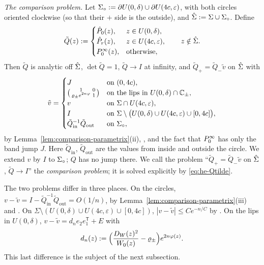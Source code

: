 \emph{The comparison problem.} Let $\Sigma_{\circ}:=\partial U(0,\delta)\cup\partial U(4c,\varepsilon)$, with both circles
oriented clockwise (so that their $+$ side is the outside), and $\hat\Sigma:=\Sigma\cup\Sigma_{\circ}$. Define
\begin{equation}\label{eq:he-Qtilde}
  \tilde Q(z):=\begin{cases}\hat P_0(z),& z\in U(0,\delta),\\ \hat P_r(z),& z\in U(4c,\varepsilon),\\
  P^\infty_0(z),& \text{otherwise},\end{cases}\qquad z\notin\hat\Sigma .
\end{equation}
Then $\tilde Q$ is analytic off $\hat\Sigma$, $\det\tilde Q=1$, $\tilde Q\to I$ at infinity, and
$\tilde Q_+=\tilde Q_-\tilde v$ on $\hat\Sigma$ with
\begin{equation}\label{eq:he-vtilde}
  \tilde v=\begin{cases}J & \text{on }(0,4c),\\
  \bigl(\begin{smallmatrix}1&0\\\varrho_\pm e^{2n\varphi}&1\end{smallmatrix}\bigr) & \text{on the lips in }U(0,\delta)\cap\mathbb{C}_\pm,\\
  v & \text{on }\Sigma\cap U(4c,\varepsilon),\\
  I & \text{on }\Sigma\setminus\bigl(U(0,\delta)\cup U(4c,\varepsilon)\cup[0,4c]\bigr),\\
  \tilde Q_{\mathrm{in}}^{-1}\tilde Q_{\mathrm{out}} & \text{on }\Sigma_{\circ},
  \end{cases}
\end{equation}
by Lemma~\ref{lem:comparison-parametrix}(ii), , and the fact that $P^\infty_0$ has only the band jump $J$. Here
$\tilde Q_{\mathrm{in}}$, $\tilde Q_{\mathrm{out}}$ are the values from inside and outside the circle. We extend $v$ by
$I$ to $\Sigma_{\circ}$; $Q$ has no jump there. We call the problem ``$\tilde Q_+=\tilde Q_-\tilde v$ on $\hat\Sigma$,
$\tilde Q\to I$'' the \emph{comparison problem}; it is solved explicitly by \eqref{eq:he-Qtilde}.

The two problems differ in three places. On the circles, $v-\tilde v=I-\tilde Q_{\mathrm{in}}^{-1}\tilde
Q_{\mathrm{out}}=O(1/n)$, by Lemma~\ref{lem:comparison-parametrix}(iii) and . On
$\Sigma\setminus(U(0,\delta)\cup U(4c,\varepsilon)\cup[0,4c])$, $|v-\tilde v|\le Ce^{-n/C}$ by . On the lips in
$U(0,\delta)$, $v-\tilde v=d_ne_2e_1^{\mathsf T}+E$ with
\begin{equation}\label{eq:he-dn}
  d_n(z):=\Bigl(\frac{D_W(z)^2}{W_0(z)}-\varrho_\pm\Bigr)e^{2n\varphi(z)} .
\end{equation}
This last difference is the subject of the next subsection.


